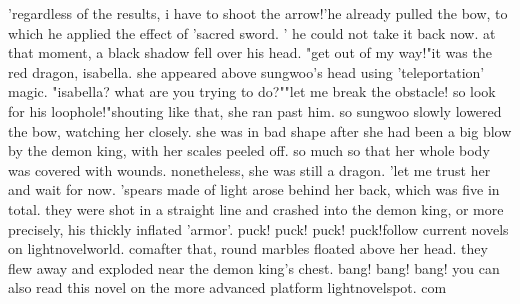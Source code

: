 'regardless of the results, i have to shoot the arrow!'he already pulled the bow, to which he applied the effect of 'sacred sword.
' he could not take it back now.
 at that moment, a black shadow fell over his head.
"get out of my way!"it was the red dragon, isabella.
she appeared above sungwoo's head using 'teleportation' magic.
"isabella? what are you trying to do?""let me break the obstacle! so look for his loophole!"shouting like that, she ran past him.
 so sungwoo slowly lowered the bow, watching her closely.
 she was in bad shape after she had been a big blow by the demon king, with her scales peeled off.
 so much so that her whole body was covered with wounds.
 nonetheless, she was still a dragon.
'let me trust her and wait for now.
'spears made of light arose behind her back, which was five in total.
 they were shot in a straight line and crashed into the demon king, or more precisely, his thickly inflated 'armor'.
puck! puck! puck! puck!follow current novels on lightnov­elworld.
comafter that, round marbles floated above her head.
 they flew away and exploded near the demon king's chest.
bang! bang! bang! you can also read this novel on the more advanced platform lightnovelspot.
com

 